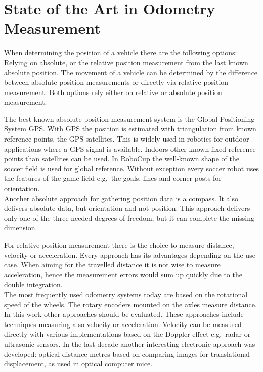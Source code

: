 \documentclass[12pt,a4paper]{article}
\begin{document}
\section{State of the Art in Odometry Measurement}

When determining the position of a vehicle there are the following options: Relying on absolute, or the relative position measurement from the last known absolute position.
The movement of a vehicle can be determined by the difference between absolute position measurements or directly via relative position measurement.
Both options rely either on relative or absolute position measurement.

The best known absolute position measurement system is the Global Positioning System GPS.
With GPS the position is estimated with triangulation from known reference points, the GPS satellites. %
This is widely used in robotics for outdoor applications where a GPS signal is available.
Indoors other known fixed reference points than satellites can be used.
In RoboCup the well-known shape of the soccer field is used for global reference.
Without exception every soccer robot uses the features of the game field e.g.\ the goals, lines and corner posts for orientation.\\
Another absolute approach for gathering position data is a compass.
It also delivers absolute data, but orientation and not position. 
This approach delivers only one of the three needed degrees of freedom, but it can complete the missing dimension.


For relative position measurement there is the choice to measure distance, velocity or acceleration.
Every approach has its advantages depending on the use case.
When aiming for the travelled distance it is not wise to measure acceleration, hence the measurement errors would sum up quickly due to the double integration.\\
The most frequently used odometry systems today are based on the rotational speed of the wheels.
The rotary encoders mounted on the axles measure distance.
In this work other approaches should be evaluated. 
These approaches include techniques measuring also velocity or acceleration.
Velocity can be measured directly with various implementations based on the Doppler effect e.g.\ radar or ultrasonic sensors.
In the last decade another interesting electronic approach was developed: optical distance metres based on comparing images for translational displacement, as used in optical computer mice.
\end{document}
